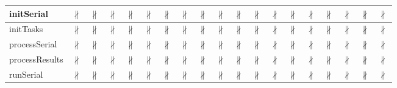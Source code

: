 \documentclass[10pt]{article}
\begin{document}
\begin{longtable}{|l|l|l|l|l|l|l|l|l|l|l|l|l|l|l|l|l|l|l|}
\hline
initSerial&{\color{BrickRed}$\nparallel$}&{\color{BrickRed}$\nparallel$}&{\color{BrickRed}$\nparallel$}&{\color{BrickRed}$\nparallel$}&{\color{BrickRed}$\nparallel$}&{\color{BrickRed}$\nparallel$}&{\color{BrickRed}$\nparallel$}&{\color{BrickRed}$\nparallel$}&{\color{BrickRed}$\nparallel$}&{\color{BrickRed}$\nparallel$}&{\color{BrickRed}$\nparallel$}&{\color{BrickRed}$\nparallel$}&{\color{BrickRed}$\nparallel$}&{\color{BrickRed}$\nparallel$}&{\color{BrickRed}$\nparallel$}&{\color{BrickRed}$\nparallel$}&{\color{BrickRed}$\nparallel$}&{\color{BrickRed}$\nparallel$}\\
\hline
initTasks&{\color{BrickRed}$\nparallel$}&{\color{BrickRed}$\nparallel$}&{\color{BrickRed}$\nparallel$}&{\color{BrickRed}$\nparallel$}&{\color{BrickRed}$\nparallel$}&{\color{BrickRed}$\nparallel$}&{\color{BrickRed}$\nparallel$}&{\color{BrickRed}$\nparallel$}&{\color{BrickRed}$\nparallel$}&{\color{BrickRed}$\nparallel$}&{\color{BrickRed}$\nparallel$}&{\color{BrickRed}$\nparallel$}&{\color{BrickRed}$\nparallel$}&{\color{BrickRed}$\nparallel$}&{\color{BrickRed}$\nparallel$}&{\color{BrickRed}$\nparallel$}&{\color{BrickRed}$\nparallel$}&{\color{BrickRed}$\nparallel$}\\
\hline
processSerial&{\color{BrickRed}$\nparallel$}&{\color{BrickRed}$\nparallel$}&{\color{BrickRed}$\nparallel$}&{\color{BrickRed}$\nparallel$}&{\color{BrickRed}$\nparallel$}&{\color{BrickRed}$\nparallel$}&{\color{BrickRed}$\nparallel$}&{\color{BrickRed}$\nparallel$}&{\color{BrickRed}$\nparallel$}&{\color{BrickRed}$\nparallel$}&{\color{BrickRed}$\nparallel$}&{\color{BrickRed}$\nparallel$}&{\color{BrickRed}$\nparallel$}&{\color{BrickRed}$\nparallel$}&{\color{BrickRed}$\nparallel$}&{\color{BrickRed}$\nparallel$}&{\color{BrickRed}$\nparallel$}&{\color{BrickRed}$\nparallel$}\\
\hline
processResults&{\color{BrickRed}$\nparallel$}&{\color{BrickRed}$\nparallel$}&{\color{BrickRed}$\nparallel$}&{\color{BrickRed}$\nparallel$}&{\color{BrickRed}$\nparallel$}&{\color{BrickRed}$\nparallel$}&{\color{BrickRed}$\nparallel$}&{\color{BrickRed}$\nparallel$}&{\color{BrickRed}$\nparallel$}&{\color{BrickRed}$\nparallel$}&{\color{BrickRed}$\nparallel$}&{\color{BrickRed}$\nparallel$}&{\color{BrickRed}$\nparallel$}&{\color{BrickRed}$\nparallel$}&{\color{BrickRed}$\nparallel$}&{\color{BrickRed}$\nparallel$}&{\color{BrickRed}$\nparallel$}&{\color{BrickRed}$\nparallel$}\\
\hline
runSerial&{\color{BrickRed}$\nparallel$}&{\color{BrickRed}$\nparallel$}&{\color{BrickRed}$\nparallel$}&{\color{BrickRed}$\nparallel$}&{\color{BrickRed}$\nparallel$}&{\color{BrickRed}$\nparallel$}&{\color{BrickRed}$\nparallel$}&{\color{BrickRed}$\nparallel$}&{\color{BrickRed}$\nparallel$}&{\color{BrickRed}$\nparallel$}&{\color{BrickRed}$\nparallel$}&{\color{BrickRed}$\nparallel$}&{\color{BrickRed}$\nparallel$}&{\color{BrickRed}$\nparallel$}&{\color{BrickRed}$\nparallel$}&{\color{BrickRed}$\nparallel$}&{\color{BrickRed}$\nparallel$}&{\color{BrickRed}$\nparallel$}\\

\end{longtable}
\end{document}
